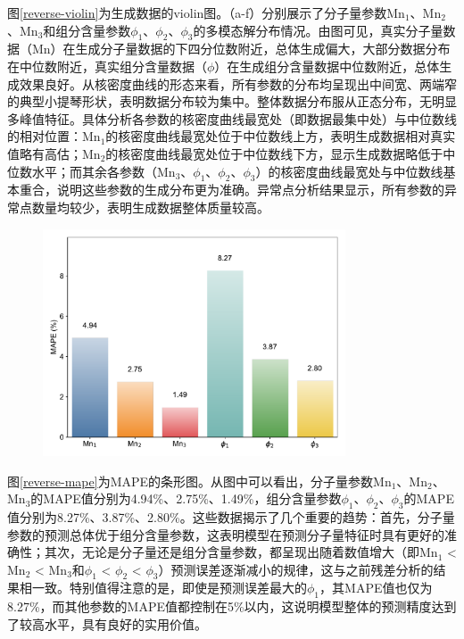 图\ref{reverse-violin}为生成数据的violin图。（a-f）分别展示了分子量参数Mn$_1$、Mn$_2$、Mn$_3$和组分含量参数$\phi_1$、$\phi_2$、$\phi_3$的多模态解分布情况。由图可见，真实分子量数据（Mn）在生成分子量数据的下四分位数附近，总体生成偏大，大部分数据分布在中位数附近，真实组分含量数据（$\phi$）在生成组分含量数据中位数附近，总体生成效果良好。从核密度曲线的形态来看，所有参数的分布均呈现出中间宽、两端窄的典型小提琴形状，表明数据分布较为集中。整体数据分布服从正态分布，无明显多峰值特征。具体分析各参数的核密度曲线最宽处（即数据最集中处）与中位数线的相对位置：Mn$_1$的核密度曲线最宽处位于中位数线上方，表明生成数据相对真实值略有高估；Mn$_2$的核密度曲线最宽处位于中位数线下方，显示生成数据略低于中位数水平；而其余各参数（Mn$_3$、$\phi_1$、$\phi_2$、$\phi_3$）的核密度曲线最宽处与中位数线基本重合，说明这些参数的生成分布更为准确。异常点分析结果显示，所有参数的异常点数量均较少，表明生成数据整体质量较高。
\begin{figure}[htbp]
  \centering
  \includegraphics[width=0.8\textwidth]{Fig/MAPE_bar_chart.pdf}
\end{figure}

图\ref{reverse-mape}为MAPE的条形图。从图中可以看出，分子量参数Mn$_1$、Mn$_2$、Mn$_3$的MAPE值分别为4.94\%、2.75\%、1.49\%，组分含量参数$\phi_1$、$\phi_2$、$\phi_3$的MAPE值分别为8.27\%、3.87\%、2.80\%。这些数据揭示了几个重要的趋势：首先，分子量参数的预测总体优于组分含量参数，这表明模型在预测分子量特征时具有更好的准确性；其次，无论是分子量还是组分含量参数，都呈现出随着数值增大（即Mn$_1$ < Mn$_2$ < Mn$_3$和$\phi_1$ < $\phi_2$ < $\phi_3$）预测误差逐渐减小的规律，这与之前残差分析的结果相一致。特别值得注意的是，即使是预测误差最大的$\phi_1$，其MAPE值也仅为8.27\%，而其他参数的MAPE值都控制在5\%以内，这说明模型整体的预测精度达到了较高水平，具有良好的实用价值。

